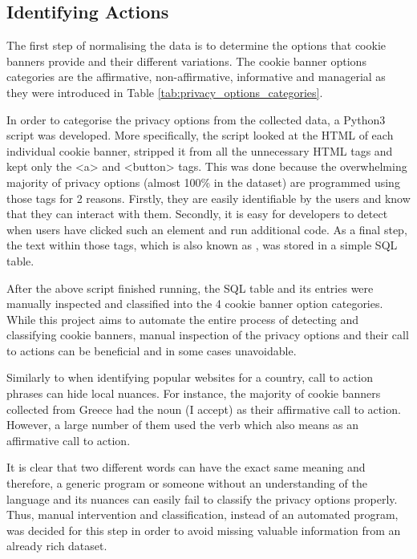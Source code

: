 \documentclass[../main.tex]{subfiles}
\begin{document}
\subsection{Identifying Actions}
The first step of normalising the data is to determine the options that cookie banners provide and their different variations. The cookie banner options categories are the affirmative, non-affirmative, informative and managerial as they were introduced in Table \ref{tab:privacy_options_categories}.

In order to categorise the privacy options from the collected data, a Python3 script was developed. More specifically, the script looked at the HTML of each individual cookie banner, stripped it from all the unnecessary HTML tags and kept only the {\selectfont <a>} and {\selectfont <button>} tags. This was done because the overwhelming majority of privacy options (almost 100\% in the dataset) are programmed using those tags for 2 reasons. Firstly, they are easily identifiable by the users and know that they can interact with them. Secondly, it is easy for developers to detect when users have clicked such an element and run additional code. As a final step, the text within those tags, which is also known as , was stored in a simple SQL table.

After the above script finished running, the SQL table and its entries were manually inspected and classified into the 4 cookie banner option categories. While this project aims to automate the entire process of detecting and classifying cookie banners, manual inspection of the privacy options and their call to actions can be beneficial and in some cases unavoidable.

Similarly to when identifying popular websites for a country, call to action phrases can hide local nuances. For instance, the majority of cookie banners collected from Greece had the noun  (I accept) as their affirmative call to action. However, a large number of them used the verb  which also means  as an affirmative call to action. 

It is clear that two different words can have the exact same meaning and therefore, a generic program or someone without an understanding of the language and its nuances can easily fail to classify the privacy options properly. Thus, manual intervention and classification, instead of an automated program, was decided for this step in order to avoid missing valuable information from an already rich dataset. 
\end{document}
